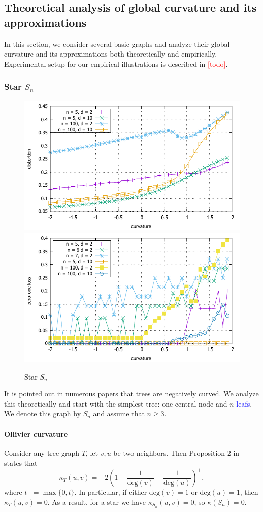 \documentclass{article} %
\newcommand{\ph}[1]{\textcolor{blue}{#1}}
\begin{document}
\subsection{Theoretical analysis of global curvature and its approximations}

In this section, we consider several basic graphs and analyze their global curvature and its approximations both theoretically and empirically. Experimental setup for our empirical illustrations is described in \textcolor{red}{[todo]}.

\subsubsection{Star $S_n$}\label{sec:S_n}

\begin{figure}
    \centering
    \includegraphics[width = 0.49 \textwidth]{star_distortion.pdf}
    \includegraphics[width = 0.49 \textwidth]{star_zero_one.pdf}
    \caption{Star $S_n$}
    \label{fig:star}
\end{figure}

It is pointed out in numerous papers that trees are negatively curved. 
We analyze this theoretically and start with the simplest tree: one central node and $n$ \ph{leafs}. We denote this graph by $S_n$ and assume that $n \ge 3$.

\paragraph{Ollivier curvature} 
Consider any tree graph $T$, let $v, u$ be two neighbors. Then Proposition 2 in~\citep{jost2014ollivier} states that
\begin{equation}\label{eq:ollivier_tree}
	\kappa_T(u,v) = -2\left(1 - \frac{1}{\mathrm{deg}(v)} - \frac{1}{\mathrm{deg}(u)}\right)^+, 
\end{equation}
where $t^+ = \max\{0,t\}$. In particular, if either $\mathrm{deg}(v) = 1$ or $\mathrm{deg}(u) = 1$, then $\kappa_T(u,v) = 0$.  As a result, for a star we have $\kappa_{S_n}(u,v) = 0$, so $\kappa(S_n) = 0$.
\end{document}
